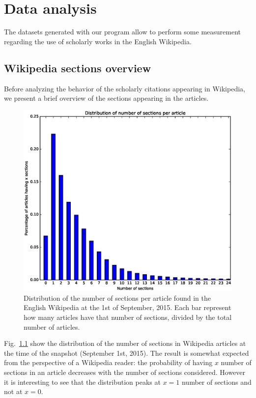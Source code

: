 
\chapter{Data analysis}
\label{cha:data_analysis}
The datasets generated with our program allow to perform some measurement regarding the use of scholarly works in the English Wikipedia.

\section{Wikipedia sections overview}
Before analyzing the behavior of the scholarly citations appearing in Wikipedia, we present a brief overview of the sections appearing in the articles.

\begin{figure}[h]
\centering
\includegraphics[keepaspectratio=true, width=\textwidth]{assets/section_counts_last_pdf}
\caption{Distribution of the number of sections per article found in the English Wikipedia at the 1st of September, 2015.
Each bar represent how many articles have that number of sections, divided by the total number of articles.}
\label{fig:section_counts_last_pdf}
\end{figure}

Fig.~\ref{fig:section_counts_last_pdf} show the distribution of the number of sections in Wikipedia articles at the time of the snapshot (September 1st, 2015).
The result is somewhat expected from the perspective of a Wikipedia reader: the probability of having $x$ number of sections in an article decreases with the number of sections considered.
However it is interesting to see that the distribution peaks at $x = 1$ number of sections and not at $x = 0$.

